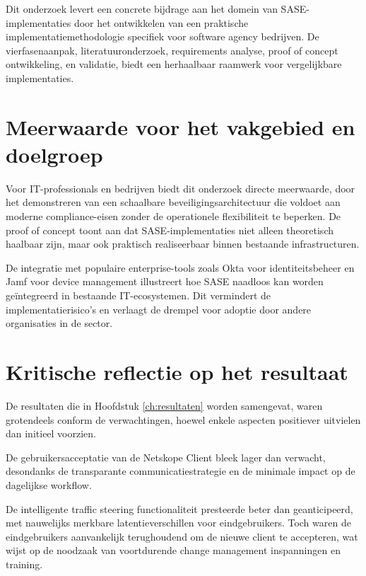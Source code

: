 Dit onderzoek levert een concrete bijdrage aan het domein van SASE-implementaties door het ontwikkelen van een praktische implementatiemethodologie specifiek voor software agency bedrijven. De vierfasenaanpak, literatuuronderzoek, requirements analyse, proof of concept ontwikkeling, en validatie, biedt een herhaalbaar raamwerk voor vergelijkbare implementaties. 

\section{Meerwaarde voor het vakgebied en doelgroep}

Voor IT-professionals en bedrijven biedt dit onderzoek directe meerwaarde, door het demonstreren van een schaalbare beveiligingsarchitectuur die voldoet aan moderne compliance-eisen zonder de operationele flexibiliteit te beperken. De proof of concept toont aan dat SASE-implementaties niet alleen theoretisch haalbaar zijn, maar ook praktisch realiseerbaar binnen bestaande infrastructuren.

\vspace{2ex}

De integratie met populaire enterprise-tools zoals Okta voor identiteitsbeheer en Jamf voor device management illustreert hoe SASE naadloos kan worden geïntegreerd in bestaande IT-ecosystemen. Dit vermindert de implementatierisico's en verlaagt de drempel voor adoptie door andere organisaties in de sector.

\section{Kritische reflectie op het resultaat}

De resultaten die in Hoofdstuk \ref{ch:resultaten} worden samengevat, waren grotendeels conform de verwachtingen, hoewel enkele aspecten positiever uitvielen dan initieel voorzien. 

\vspace{2ex}

De gebruikersacceptatie van de Netskope Client bleek lager dan verwacht, desondanks de transparante communicatiestrategie en de minimale impact op de dagelijkse workflow. 

\vspace{2ex}

De intelligente traffic steering functionaliteit presteerde beter dan geanticipeerd, met nauwelijks merkbare latentieverschillen voor eindgebruikers. Toch waren de eindgebruikers aanvankelijk terughoudend om de nieuwe client te accepteren, wat wijst op de noodzaak van voortdurende change management inspanningen en training.

